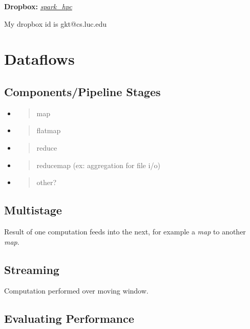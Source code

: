 \documentclass{sig-alternate}
\begin{document}
\textbf{Dropbox:}
\href{https://www.dropbox.com/sh/odsd9uxe1elbhbf/AAD8J1TGuFY1VHJl2oPdm5E0a?dl=0}{\emph{spark\_hpc}}

My dropbox id is gkt@cs.luc.edu

\section{Dataflows}\label{dataflows}

\subsection{Components/Pipeline Stages}\label{componentspipeline-stages}

\begin{itemize}
\item
  \begin{quote}
  map
  \end{quote}
\item
  \begin{quote}
  flatmap
  \end{quote}
\item
  \begin{quote}
  reduce
  \end{quote}
\item
  \begin{quote}
  reducemap (ex: aggregation for file i/o)
  \end{quote}
\item
  \begin{quote}
  other?
  \end{quote}
\end{itemize}

\subsection{Multistage}\label{multistage}

Result of one computation feeds into the next, for example a \emph{map}
to another \emph{map}.

\subsection{Streaming}\label{streaming}

Computation performed over moving window.

\subsection{Evaluating Performance}\label{evaluating-performance}
\end{document}
